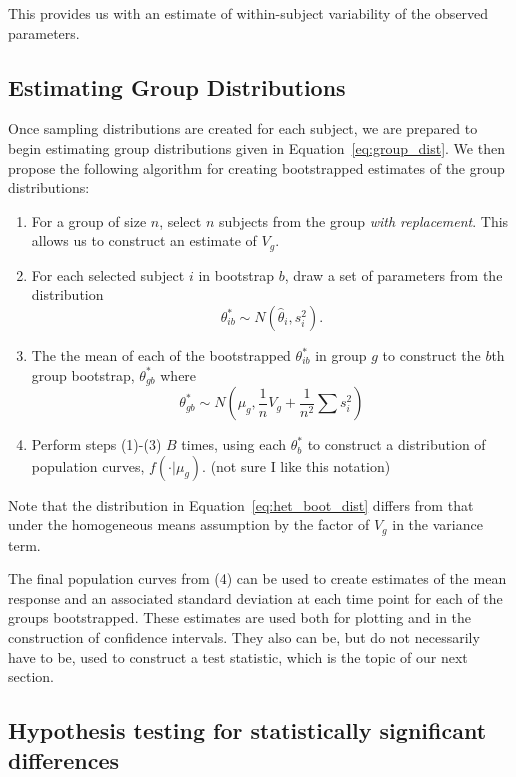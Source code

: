 This provides us with an estimate of within-subject variability of the observed parameters. 


\subsection{Estimating Group Distributions}\label{sec:group_dist}

Once sampling distributions are created for each subject, we are prepared to begin estimating group distributions given in Equation~\ref{eq:group_dist}. We then propose the following algorithm for creating bootstrapped estimates of the group distributions:


\begin{enumerate}
\item For a group of size $n$, select $n$ subjects from the group \textit{with replacement}. This allows us to construct an estimate of $V_{g}$.
\item For each selected subject $i$ in bootstrap $b$, draw a set of parameters from the distribution 
\begin{equation}
\theta_{ib}^* \sim N(\hat{\theta}_i, s_i^2).
\end{equation}
\item The the mean of each of the bootstrapped $\theta_{ib}^*$ in group $g$ to construct the $b$th group bootstrap, $\theta_{gb}^*$ where
\begin{equation}\label{eq:het_boot_dist}
\theta_{gb}^* \sim N \left(\mu_g, \frac{1}{n} V_g + \frac{1}{n^2} \sum s_i^2 \right)
\end{equation}
\item Perform steps (1)-(3) $B$ times, using each $\theta_b^*$ to construct a distribution of population curves, $f(\cdot| \mu_g)$. (not sure I like this notation)
\end{enumerate}

Note that the distribution in Equation~\ref{eq:het_boot_dist} differs from that under the homogeneous means assumption by the factor of $V_g$ in the variance term.


The final population curves from (4) can be used to create estimates of the mean response and an associated standard deviation at each time point for each of the groups bootstrapped. These estimates are used both for plotting and in the construction of confidence intervals. They also can be, but do not necessarily have to be, used to construct a test statistic, which is the topic of our next section.

\subsection{Hypothesis testing for statistically significant differences}

